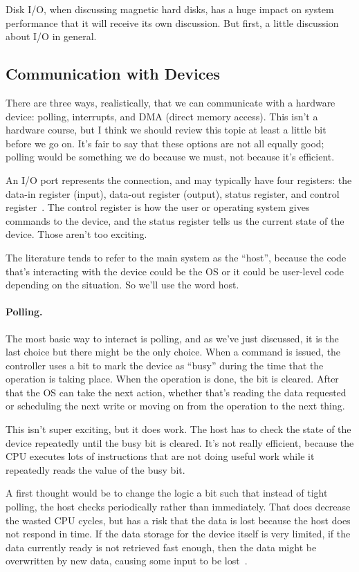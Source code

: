 Disk I/O, when discussing magnetic hard disks, has a huge impact on system performance that it will receive its own discussion. But first, a little discussion about I/O in general.

\subsection*{Communication with Devices}
There are three ways, realistically, that we can communicate with a hardware device: polling, interrupts, and DMA (direct memory access). This isn't a hardware course, but I think we should review this topic at least a little bit before we go on. It's fair to say that these options are not all equally good; polling would be something we do because we must, not because it's efficient.

An I/O port represents the connection, and may typically have four registers: the data-in register (input), data-out register (output), status register, and control register~\cite{osc}. The control register is how the user or operating system gives commands to the device, and the status register tells us the current state of the device. Those aren't too exciting. 

The literature tends to refer to the main system as the ``host'', because the code that's interacting with the device could be the OS or it could be user-level code depending on the situation. So we'll use the word host.

\paragraph{Polling.} 
The most basic way to interact is polling, and as we've just discussed, it is the last choice but there might be the only choice. When a command is issued, the controller uses a bit to mark the device as ``busy'' during the time that the operation is taking place. When the operation is done, the bit is cleared. After that the OS can take the next action, whether that's reading the data requested or scheduling the next write or moving on from the operation to the next thing. 

This isn't super exciting, but it does work. The host has to check the state of the device repeatedly until the busy bit is cleared. It's not really efficient, because the CPU executes lots of instructions that are not doing useful work while it repeatedly reads the value of the busy bit. 

A first thought would be to change the logic a bit such that instead of tight polling, the host checks periodically rather than immediately. That does decrease the wasted CPU cycles, but has a risk that the data is lost because the host does not respond in time. If the data storage for the device itself is very limited, if the data currently ready is not retrieved fast enough, then the data might be overwritten by new data, causing some input to be lost~\cite{osc}.

